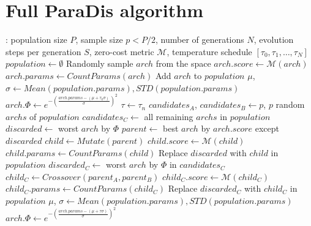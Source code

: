 \documentclass[10pt]{article} %
\begin{document}
\section{Full ParaDis algorithm}
\label{apx_algorithm}

\begin{algorithm}[H]
\caption{\underline{\textbf{Para}}meter \underline{\textbf{Dis}}tribution Shift NAS (\textbf{ParaDis})}
\label{alg_paradis}
\begin{algorithmic}[1]
\Require: population size $P$, sample size $p < P/2$, number of generations $N$, evolution steps per generation $S$, zero-cost metric $\mathcal{M}$, temperature schedule $[\tau_0, \tau_1, \dots, \tau_N]$
\State $population \gets \emptyset$
\State Randomly sample $arch$ from the space
\State $arch.score \gets \mathcal{M}(arch)$
\State $arch.params \gets CountParams(arch)$
\State Add $arch$ to $population$
\EndWhile
\State $\mu$, $\sigma \gets Mean(population.params), STD(population.params)$
\State $arch.\Phi \gets e^{-(\frac{arch.params - (\mu + \tau_0 \sigma)}{\sigma})^2}$
\EndFor
{}
\State $\tau \gets \tau_n$
\State $candidates_A$, $candidates_B \gets p$, $p$ random $archs$ of $population$
\State $candidates_C \gets$ all remaining $archs$ in $population$
\State $discarded \gets$ worst $arch$ by $\Phi$
\State $parent \gets$ best $arch$ by $arch.score$ except $discarded$
\State $child \gets Mutate(parent)$
\State $child.score \gets \mathcal{M}(child)$
\State $child.params \gets CountParams(child)$
\State Replace $discarded$ with $child$ in $population$
\EndFor
\State $discarded_C \gets$ worst $arch$ by $\Phi$ in $candidates_C$
\State $child_C \gets Crossover(parent_A, parent_B)$
\State $child_C.score \gets \mathcal{M}(child_C)$
\State $child_C.params \gets CountParams(child_C)$
\State Replace $discarded_C$ with $child_C$ in $population$
\EndFor
\State $\mu$, $\sigma \gets Mean(population.params), STD(population.params)$
\State $arch.\Phi \gets e^{-(\frac{arch.params - (\mu + \tau \sigma)}{\sigma})^2}$
\EndFor
\EndFor
\end{algorithmic}
\end{algorithm}
\end{document}
